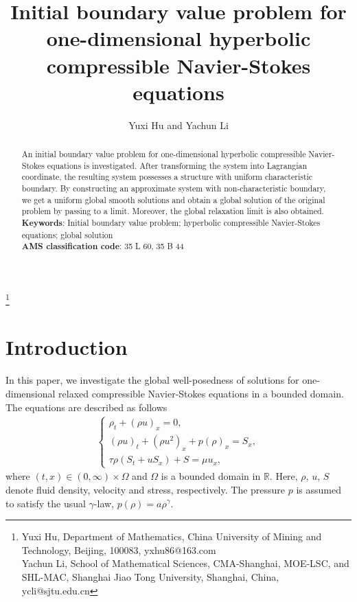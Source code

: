 \documentclass[10pt,reqno]{amsart}
\numberwithin{equation}{section}
\begin{document}
\title[IBVP for relaxed CNS]{Initial boundary value problem for one-dimensional hyperbolic compressible Navier-Stokes equations}
\author{Yuxi Hu and Yachun Li}
 \thanks{\noindent Yuxi Hu, Department of Mathematics, China University of Mining and Technology, Beijing, 100083, yxhu86@163.com\\
Yachun Li, School of Mathematical Sciences, CMA-Shanghai, MOE-LSC, and SHL-MAC, Shanghai Jiao Tong University,  Shanghai, China, ycli@sjtu.edu.cn
}
\begin{abstract}
An initial boundary value problem for one-dimensional hyperbolic compressible Navier-Stokes equations is investigated. After transforming the system into Lagrangian coordinate, the resulting system possesses a structure with uniform characteristic boundary. By constructing an approximate system with non-characteristic boundary, we  get a uniform  global smooth solutions and obtain a global solution of the original problem by passing to a limit. Moreover, the global  relaxation limit  is also obtained.  \\
{\bf Keywords}: Initial boundary value problem; hyperbolic  compressible Navier-Stokes equations; global solution\\ 
 {\bf AMS classification code}: 35 L 60, 35 B 44
\end{abstract}
\maketitle
\section{Introduction}
In this paper, we investigate the global well-posedness of solutions for one-dimensional relaxed compressible Navier-Stokes equations in a bounded domain. The equations are described as follows
\begin{align}\label{1.1}
\begin{cases}
\rho_t+(\rho u)_x=0,\\
(\rho u)_t+(\rho u^2)_x+p(\rho)_x=S_x,\\
\tau \rho (S_t+ u S_x)+S=\mu u_x,
\end{cases}
\end{align}
where $(t,x)\in (0, \infty) \times \Omega$ and $\Omega$ is a bounded domain in $\mathbb R$. Here, $\rho$, $u$, $S$ denote fluid density, velocity and stress, respectively. 
The pressure $p$ is assumed to satisfy the usual $\gamma$-law, $p(\rho)=a \rho^\gamma$.
\end{document}
